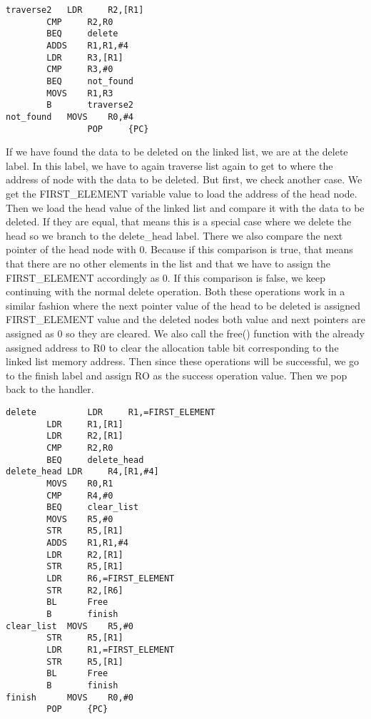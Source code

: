 \documentclass[pdftex,12pt,a4paper]{article}
\begin{document}
\begin{lstlisting}
traverse2	LDR     R2,[R1] 				
		CMP     R2,R0					
		BEQ     delete					
		ADDS    R1,R1,#4				
		LDR     R3,[R1]					
		CMP     R3,#0						
		BEQ     not_found				
		MOVS    R1,R3					
		B       traverse2
not_found	MOVS    R0,#4						
                POP     {PC}
\end{lstlisting}

If we have found the data to be deleted on the linked list, we are at the delete label. In this label, we have to again traverse list again to get to where the address of node with the data to be deleted. But first, we check another case. We get the FIRST\_ELEMENT variable value to load the address of the head node. Then we load the head value of the linked list and compare it with the data to be deleted. If they are equal, that means this is a special case where we delete the head so we branch to the delete\_head label. There we also compare the next pointer of the head node with 0. Because if this comparison is true, that means that there are no other elements in the list and that we have to assign the FIRST\_ELEMENT accordingly as 0. If this comparison is false, we keep continuing with the normal delete operation. Both these operations work in a similar fashion where the next pointer value of the head to be deleted is assigned FIRST\_ELEMENT value and the deleted nodes both value and next pointers are assigned as 0 so they are cleared. We also call the free() function with the already assigned address to R0 to clear the allocation table bit corresponding to the linked list memory address. Then since these operations will be successful, we go to the finish label and assign RO as the success operation value. Then we pop back to the handler.

\begin{lstlisting}
delete	        LDR     R1,=FIRST_ELEMENT			
		LDR     R1,[R1]					
		LDR     R2,[R1] 					
		CMP     R2,R0						
		BEQ     delete_head	
delete_head	LDR     R4,[R1,#4]				
		MOVS    R0,R1						
		CMP     R4,#0					
		BEQ     clear_list				
		MOVS    R5,#0					
		STR     R5,[R1]					
		ADDS    R1,R1,#4				
		LDR     R2,[R1]						
		STR     R5,[R1]					
		LDR     R6,=FIRST_ELEMENT		
		STR     R2,[R6]					
		BL      Free						
		B       finish
clear_list	MOVS    R5,#0						
		STR     R5,[R1]						
		LDR     R1,=FIRST_ELEMENT			
		STR     R5,[R1]					
		BL      Free						
		B       finish
finish 		MOVS    R0,#0						
		POP     {PC}
\end{lstlisting}
\end{document}
